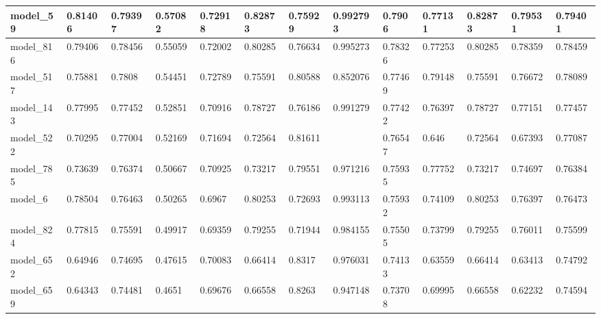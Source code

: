 \begin{tabular}{|l|l|l|l|l|l|l|l|l|l|l|l|l|}
model\_59      & 0.81406     & 0.79397        & 0.57082      & 0.72918          & 0.82873              & 0.75929              & 0.992793     & 0.7906            & 0.77131            & 0.82873         & 0.79531     & 0.79401      \\ \hline
model\_816     & 0.79406     & 0.78456        & 0.55059      & 0.72002          & 0.80285              & 0.76634              & 0.995273     & 0.78326           & 0.77253            & 0.80285         & 0.78359     & 0.78459      \\ \hline
model\_517     & 0.75881     & 0.7808         & 0.54451      & 0.72789          & 0.75591              & 0.80588              & 0.852076     & 0.77469           & 0.79148            & 0.75591         & 0.76672     & 0.78089      \\ \hline
model\_143     & 0.77995     & 0.77452        & 0.52851      & 0.70916          & 0.78727              & 0.76186              & 0.991279     & 0.77422           & 0.76397            & 0.78727         & 0.77151     & 0.77457      \\ \hline
model\_522     & 0.70295     & 0.77004        & 0.52169      & 0.71694          & 0.72564              & 0.81611              &              & 0.76547           & 0.646              & 0.72564         & 0.67393     & 0.77087      \\ \hline
model\_785     & 0.73639     & 0.76374        & 0.50667      & 0.70925          & 0.73217              & 0.79551              & 0.971216     & 0.75935           & 0.77752            & 0.73217         & 0.74697     & 0.76384      \\ \hline
model\_6       & 0.78504     & 0.76463        & 0.50265      & 0.6967           & 0.80253              & 0.72693              & 0.993113     & 0.75932           & 0.74109            & 0.80253         & 0.76397     & 0.76473      \\ \hline
model\_824     & 0.77815     & 0.75591        & 0.49917      & 0.69359          & 0.79255              & 0.71944              & 0.984155     & 0.75505           & 0.73799            & 0.79255         & 0.76011     & 0.75599      \\ \hline
model\_652     & 0.64946     & 0.74695        & 0.47615      & 0.70083          & 0.66414              & 0.8317               & 0.976031     & 0.74133           & 0.63559            & 0.66414         & 0.63413     & 0.74792      \\ \hline
model\_659     & 0.64343     & 0.74481        & 0.4651       & 0.69676          & 0.66558              & 0.8263               & 0.947148     & 0.73708           & 0.69995            & 0.66558         & 0.62232     & 0.74594      \\ \hline

\end{tabular}
